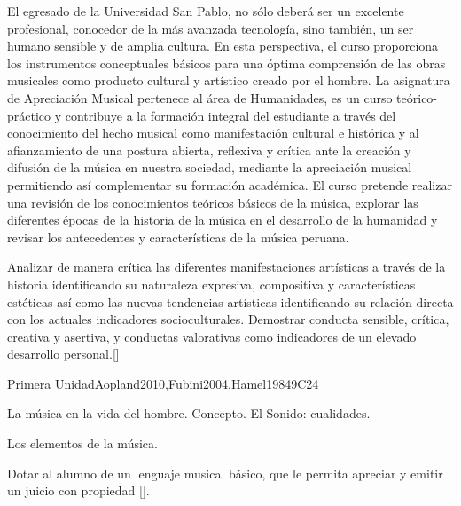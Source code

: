 \begin{syllabus}


\begin{justification}
El egresado de la Universidad San Pablo, no sólo deberá ser un excelente profesional, conocedor de la más avanzada tecnología, sino también, un ser humano sensible y de amplia cultura. En esta perspectiva, el curso proporciona los instrumentos conceptuales básicos para una óptima comprensión de las obras musicales como producto cultural y artístico creado por el hombre.
La asignatura de Apreciación Musical pertenece al área de Humanidades, es  un curso teórico-práctico y contribuye a la formación integral del estudiante a través del  conocimiento del hecho musical como manifestación cultural e histórica y al afianzamiento de una postura abierta, reflexiva y crítica ante la creación y difusión de la música en nuestra sociedad, mediante la apreciación musical permitiendo así  complementar  su formación académica. El curso pretende realizar una revisión de los conocimientos teóricos básicos de la música, explorar las diferentes épocas de la historia de la música en el desarrollo de la humanidad y revisar los antecedentes y características de la música peruana.
\end{justification}

\begin{goals}
\item Analizar de manera crítica las diferentes manifestaciones artísticas a través de la historia identificando su naturaleza expresiva, compositiva y características estéticas así como las nuevas tendencias artísticas identificando su relación directa con los actuales indicadores socioculturales. Demostrar conducta sensible, crítica, creativa y asertiva, y conductas valorativas como indicadores de un elevado desarrollo personal.[\Familiarity]
\end{goals}

\begin{outcomes}
    \item {}
\end{outcomes}
\begin{competences}
    \item {}
\end{competences}

\begin{unit}{}{Primera Unidad}{Aopland2010,Fubini2004,Hamel1984}{9}{C24}
\begin{topics}
	\item La música en la vida del hombre. 
		\subitem Concepto. 
		\subitem El Sonido: cualidades.
	\item Los elementos de la música. 
\end{topics}
\begin{learningoutcomes}
	\item Dotar al alumno de un lenguaje musical básico, que le permita apreciar y emitir un juicio con propiedad [\Usage].
\end{learningoutcomes}
\end{unit}


\end{syllabus}
